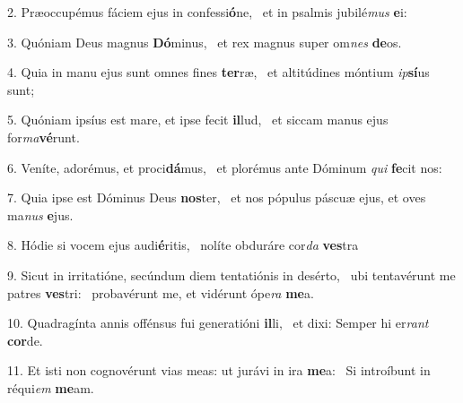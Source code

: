 2. Præoccupémus fáciem ejus in confessi\textbf{ó}ne, \ast\  et in psalmis jubilé\textit{mus} \textbf{e}i:\

3. Quóniam Deus magnus \textbf{Dó}minus, \ast\  et rex magnus super om\textit{nes} \textbf{de}os.\

4. Quia in manu ejus sunt omnes fines \textbf{ter}ræ, \ast\  et altitúdines móntium \textit{ip}\textbf{sí}us sunt;\

5. Quóniam ipsíus est mare, et ipse fecit \textbf{il}lud, \ast\  et siccam manus ejus for\textit{ma}\textbf{vé}runt.\

6. Veníte, adorémus, et proci\textbf{dá}mus, \ast\  et plorémus ante Dóminum \textit{qui} \textbf{fe}cit nos:\

7. Quia ipse est Dóminus Deus \textbf{nos}ter, \ast\  et nos pópulus páscuæ ejus, et oves ma\textit{nus} \textbf{e}jus.\

8. Hódie si vocem ejus audi\textbf{é}ritis, \ast\  nolíte obduráre cor\textit{da} \textbf{ves}tra\

9. Sicut in irritatióne, secúndum diem tentatiónis in desérto, \dag\  ubi tentavérunt me patres \textbf{ves}tri: \ast\  probavérunt me, et vidérunt ópe\textit{ra} \textbf{me}a.\

10. Quadragínta annis offénsus fui generatióni \textbf{il}li, \ast\  et dixi: Semper hi er\textit{rant} \textbf{cor}de.\

11. Et isti non cognovérunt vias meas: ut jurávi in ira \textbf{me}a: \ast\  Si introíbunt in réqui\textit{em} \textbf{me}am.\

